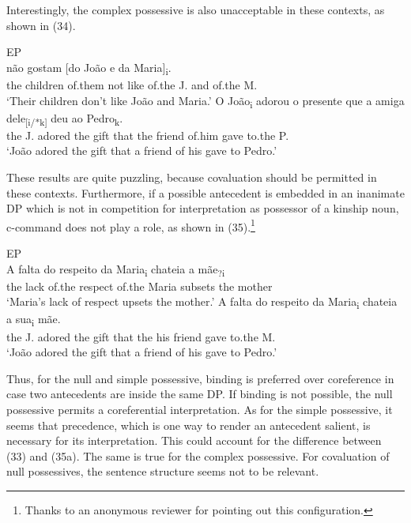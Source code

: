 \documentclass[output=paper]{langsci/langscibook}
\begin{document}
Interestingly, the complex possessive is also unacceptable in these contexts, as shown in (34).

\ea%
         EP\label{ex:wein:34}\\
    \ea  
    \gll {} não gostam [do João e da Maria]\textsubscript{i}.\\
         the children of.them not like of.the J. and of.the M.\\
    \glt ‘Their children don’t like João and Maria.’
    \ex  
    \gll O João\textsubscript{i} adorou o presente que a amiga dele\textsubscript{[i/*k]} deu ao Pedro\textsubscript{k}.\\
         the J. adored the gift that the friend of.him gave to.the P.\\
    \glt ‘João adored the gift that a friend of his gave to Pedro.’
    \z
\z

These results are quite puzzling, because covaluation should be permitted in these contexts. Furthermore, if a possible antecedent is embedded in an inanimate DP which is not in competition for interpretation as possessor of a kinship noun, c-command does not play a role, as shown in (35).\footnote{Thanks to an anonymous reviewer for pointing out this configuration.}

\ea%
         EP\label{ex:wein:35}\\
    \ea            
    \gll A falta do respeito da Maria\textsubscript{i} chateia a mãe\textsubscript{?i}\\
         the lack of.the respect of.the Maria subsets the mother\\
    \glt ‘Maria’s lack of respect upsets the mother.’
    \ex  
    \gll A falta do respeito da Maria\textsubscript{i} chateia a sua\textsubscript{i} mãe.\\
         the J. adored the gift that the his friend gave to.the M.\\
    \glt ‘João adored the gift that a friend of his gave to Pedro.’ 
    \z
\z


Thus, for the null and simple possessive, binding is preferred over coreference in case two antecedents are inside the same DP. If binding is not possible, the null possessive permits a coreferential interpretation. As for the simple possessive, it seems that precedence, which is one way to render an antecedent salient, is necessary for its interpretation. This could account for the difference between (33) and (35a). The same is true for the complex possessive. For covaluation of null possessives, the sentence structure seems not to be relevant.
\end{document}
